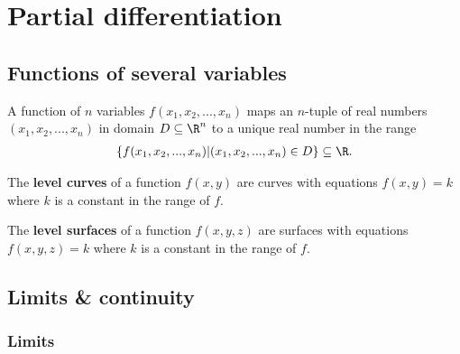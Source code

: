 \documentclass{article}
\begin{document}
\section{Partial differentiation}



\subsection{Functions of several variables}


\begin{definition}
	A function of $n$ variables $f(x_1, x_2, ..., x_n)$ maps an $n$-tuple
	of real numbers $(x_1, x_2, ..., x_n)$ in domain $D\subseteq\R^n$ to
	a unique real number in the range
	\begin{align*}
		\{f(x_1, x_2, ..., x_n)|(x_1, x_2, ..., x_n)\in D\} \subseteq \R.
	\end{align*}
\end{definition}
\begin{definition}
	The \textbf{level curves} of a function $f(x,y)$ are curves with equations
	$f(x,y)=k$ where $k$ is a constant in the range of $f$.
\end{definition}
\begin{definition}
	The \textbf{level surfaces} of a function $f(x,y,z)$ are surfaces with
	equations $f(x,y,z)=k$ where $k$ is a constant in the range of $f$.
\end{definition}


\subsection{Limits \& continuity}


\subsubsection{Limits}
\end{document}
